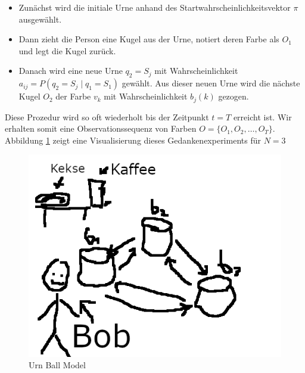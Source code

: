 \begin{itemize}
    \item Zunächst wird die initiale Urne anhand des Startwahrscheinlichkeitsvektor $\pi$ ausgewählt.
    \item Dann zieht die Person eine Kugel aus der Urne, notiert deren Farbe als $O_1$ und legt die Kugel zurück.
    \item Danach wird eine neue Urne $q_2 = S_j$ mit Wahrscheinlichkeit $a_{ij} = P(q_2 = S_j \mid q_1 = S_1)$ gewählt. Aus dieser neuen Urne wird die nächste Kugel $O_2$ der Farbe $v_k$ mit Wahrscheinlichkeit $b_j(k)$ gezogen.
\end{itemize}
Diese Prozedur wird so oft wiederholt bis der Zeitpunkt $t=T$ erreicht ist. Wir erhalten somit eine Observationssequenz von Farben $O= \{O_1, O_2, \dots, O_T \}$.
Abbildung \ref{fig:urn_ball_model} zeigt eine Visualisierung dieses Gedankenexperiments für $N=3$

\begin{figure}[h!]
    \includegraphics[scale=1.0]{images/Ball_Urn_Model.png}
    \caption{Urn Ball Model}
    \label{fig:urn_ball_model}
\end{figure}
